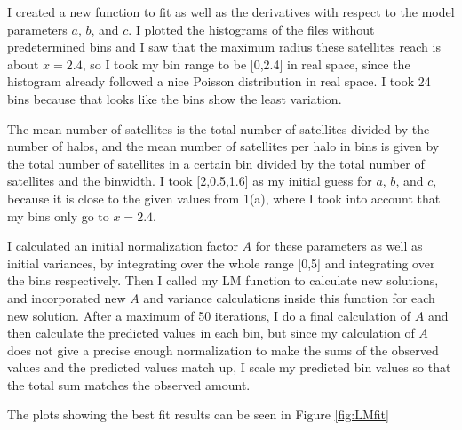 I created a new function to fit as well as the derivatives with respect to the model parameters $a$, $b$, and $c$.
I plotted the histograms of the files without predetermined bins and I saw that the maximum radius these satellites reach is about $x = 2.4$, so I took my bin range to be [0,2.4] in real space, since the histogram already followed a nice Poisson distribution in real space.
I took 24 bins because that looks like the bins show the least variation.

The mean number of satellites is the total number of satellites divided by the number of halos, and the mean number of satellites per halo in bins is given by the total number of satellites in a certain bin divided by the total number of satellites and the binwidth.
I took [2,0.5,1.6] as my initial guess for $a$, $b$, and $c$, because it is close to the given values from 1(a), where I took into account that my bins only go to $x = 2.4$.

I calculated an initial normalization factor $A$ for these parameters as well as initial variances, by integrating over the whole range [0,5] and integrating over the bins respectively.
Then I called my LM function to calculate new solutions, and incorporated new $A$ and variance calculations inside this function for each new solution. 
After a maximum of 50 iterations, I do a final calculation of $A$ and then calculate the predicted values in each bin, but since my calculation of $A$ does not give a precise enough normalization to make the sums of the observed values and the predicted values match up, I scale my predicted bin values so that the total sum matches the observed amount.

The plots showing the best fit results can be seen in Figure \ref{fig:LMfit}

